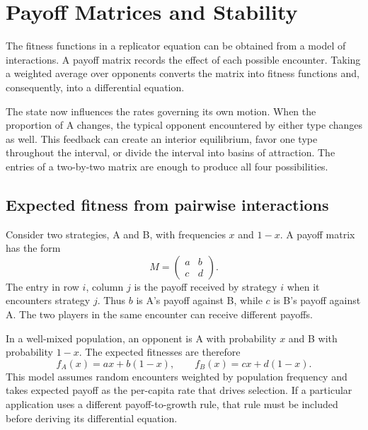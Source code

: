 \documentclass[11pt,oneside,openany]{book}
\theoremstyle{definition}
\theoremstyle{remark}
\numberwithin{equation}{chapter}
\begin{document}
\mainmatter
\setcounter{chapter}{1}
\chapter{Payoff Matrices and Stability}
\label{ch:payoffs}

The fitness functions in a replicator equation can be obtained from a model of interactions. A payoff matrix records the effect of each possible encounter. Taking a weighted average over opponents converts the matrix into fitness functions and, consequently, into a differential equation.

The state now influences the rates governing its own motion. When the proportion of A changes, the typical opponent encountered by either type changes as well. This feedback can create an interior equilibrium, favor one type throughout the interval, or divide the interval into basins of attraction. The entries of a two-by-two matrix are enough to produce all four possibilities.

\section{Expected fitness from pairwise interactions}
Consider two strategies, A and B, with frequencies $x$ and $1-x$. A payoff matrix has the form
\begin{equation}\label{eq:matrix2}
M=\begin{pmatrix}a&b\\c&d\end{pmatrix}.
\end{equation}
The entry in row $i$, column $j$ is the payoff received by strategy $i$ when it encounters strategy $j$. Thus $b$ is A's payoff against B, while $c$ is B's payoff against A. The two players in the same encounter can receive different payoffs.

In a well-mixed population, an opponent is A with probability $x$ and B with probability $1-x$. The expected fitnesses are therefore
\begin{equation}\label{eq:expectedfitness}
f_A(x)=ax+b(1-x),\qquad f_B(x)=cx+d(1-x).
\end{equation}
This model assumes random encounters weighted by population frequency and takes expected payoff as the per-capita rate that drives selection. If a particular application uses a different payoff-to-growth rule, that rule must be included before deriving its differential equation.
\end{document}
